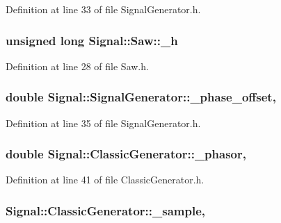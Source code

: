 Definition at line 33 of file Signal\+Generator.\+h.

\hypertarget{class_signal_1_1_saw_a359bfaaab07a3c830da6b81baf045330}{
\subsubsection[{\+\_\+h}]{\setlength{\rightskip}{0pt plus 5cm}unsigned long Signal\+::\+Saw\+::\+\_\+h\hspace{0.3cm}{\ttfamily [protected]}}}\label{class_signal_1_1_saw_a359bfaaab07a3c830da6b81baf045330}


Definition at line 28 of file Saw.\+h.

\hypertarget{class_signal_1_1_signal_generator_a6b4444d46747c8517171edbbf4b5588f}{
\subsubsection[{\+\_\+phase\+\_\+offset}]{\setlength{\rightskip}{0pt plus 5cm}double Signal\+::\+Signal\+Generator\+::\+\_\+phase\+\_\+offset\hspace{0.3cm}{\ttfamily [protected]}, {\ttfamily [inherited]}}}\label{class_signal_1_1_signal_generator_a6b4444d46747c8517171edbbf4b5588f}


Definition at line 35 of file Signal\+Generator.\+h.

\hypertarget{class_signal_1_1_classic_generator_ade9b66bc49d2d2f40a1390fc6374b8b2}{
\subsubsection[{\+\_\+phasor}]{\setlength{\rightskip}{0pt plus 5cm}double Signal\+::\+Classic\+Generator\+::\+\_\+phasor\hspace{0.3cm}{\ttfamily [protected]}, {\ttfamily [inherited]}}}\label{class_signal_1_1_classic_generator_ade9b66bc49d2d2f40a1390fc6374b8b2}


Definition at line 41 of file Classic\+Generator.\+h.

\hypertarget{class_signal_1_1_classic_generator_a40313d0d806d6e44af7d41b3ef3a0822}{
\subsubsection[{\+\_\+sample}]{ Signal\+::\+Classic\+Generator\+::\+\_\+sample\hspace{0.3cm}{\ttfamily [protected]}, {\ttfamily [inherited]}}}\label{class_signal_1_1_classic_generator_a40313d0d806d6e44af7d41b3ef3a0822}


